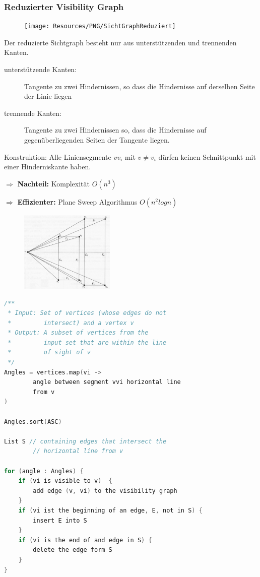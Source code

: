 \pagebreak
\subsubsection{Reduzierter Visibility Graph}
{
\begin{figure}
	\texttt{[image: Resources/PNG/SichtGraphReduziert]}
\end{figure}
Der reduzierte Sichtgraph besteht nur aus unterstützenden und trennenden Kanten.
\begin{description}
	\item[unterstützende Kanten:] Tangente zu zwei Hindernis\-sen, so dass die
		Hindernisse auf derselben Seite der Linie liegen
	\item[trennende Kanten:] Tangente zu zwei Hindernissen so, dass die Hindernisse
		auf gegenüberliegenden Seiten der Tangente liegen.
\end{description}

Konstruktion:
Alle Liniensegmente $vv_i$ mit $v \neq v_i$ dürfen keinen Schnittpunkt mit
einer Hinderniskante haben.

$\Rightarrow$ \textbf{Nachteil:} Komplexität $O(n^3)$

$\Rightarrow$ \textbf{Effizienter:} Plane Sweep Algorithmus $O(n^2 log n)$

}
{
\begin{figure}
	\includegraphics[width=0.4\textwidth]{Resources/PNG/sweepLineAlgorithmus}
\end{figure}
\ActivateWarningFilters[wrapfiglisting]
\begin{lstlisting}[language=c, caption={Sweep Line Algorithmus}]
/**
 * Input: Set of vertices (whose edges do not
 *         intersect) and a vertex v
 * Output: A subset of vertices from the
 *         input set that are within the line
 *         of sight of v
 */
Angles = vertices.map(vi ->
		angle between segment vvi horizontal line
		from v
)

Angles.sort(ASC)

List S // containing edges that intersect the
        // horizontal line from v

for (angle : Angles) {
	if (vi is visible to v)  {
		add edge (v, vi) to the visibility graph
	}
	if (vi ist the beginning of an edge, E, not in S) {
		insert E into S
	}
	if (vi is the end of and edge in S) {
		delete the edge form S
	}
}
\end{lstlisting}
\DeactivateWarningFilters[wrapfiglisting]

}

